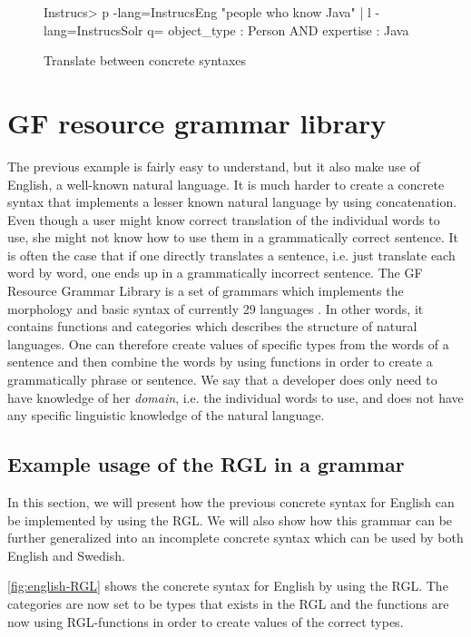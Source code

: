 \begin{figure}[H]
\begin{terminal}
Instrucs> p -lang=InstrucsEng "people who know Java" | l -lang=InstrucsSolr
q= object_type : Person AND expertise : Java
\end{terminal}
\caption{Translate between concrete syntaxes\label{fig:translation-concr}}
\end{figure}

\section{GF resource grammar library}

The previous example is fairly easy to understand, but it also make use of English, a well-known natural language. It is much harder to create a concrete syntax that implements a lesser known natural language by using concatenation. Even though a user might know correct translation of the individual words to use, she might not know how to use them in a grammatically correct sentence. It is often the case that if one directly translates a sentence, i.e. just translate each word by word, one ends up in a grammatically incorrect sentence.
\newline
\newline
The GF Resource Grammar Library \cite{gf-rgl} is a set of grammars which implements the morphology and basic syntax of currently 29 languages \cite{gf-rgl-synopsis}. In other words, it contains functions and categories which describes the structure of natural languages. One can therefore create values of specific types from the words of a sentence and then combine the words by using functions in order to create a grammatically phrase or sentence. We say that a developer does only need to have knowledge of her \emph{domain}, i.e. the individual words to use, and does not have any specific linguistic knowledge of the natural language.

\subsection*{Example usage of the RGL in a grammar}

In this section, we will present how the previous concrete syntax for English can be implemented by using the RGL. We will also show how this grammar can be further generalized into an incomplete concrete syntax which can be used by both English and Swedish.

\autoref{fig:english-RGL} shows the concrete syntax for English by using the RGL. The categories are now set to be types that exists in the RGL and the functions are now using RGL-functions in order to create values of the correct types.

